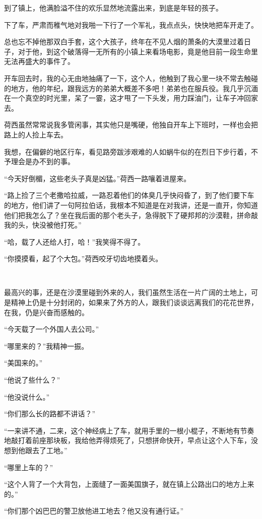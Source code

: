 \par 到了镇上，他满脸溢不住的欢乐显然地流露出来，到底是年轻的孩子。
\par 下了车，严肃而稚气地对我啪一下行了一个军礼，我点点头，快快地把车开走了。
\par 总也忘不掉他那双白手套，这个大孩子，终年在不见人烟的萧条的大漠里过着日子，对于他，到这个破落得一无所有的小镇上来看场电影，竟是他目前一段生命里无法再盛大的事件了。
\par 开车回去时，我的心无由地抽痛了一下，这个人，他触到了我心里一块不常去触碰的地方，他的年纪，跟我远方的弟弟大概差不多吧！弟弟也在服兵役。我几乎沉湎在一个真空的时光里，呆了一霎，这才甩了一下头发，用力踩油门，让车子冲回家去。
\par 荷西虽然常常说我多管闲事，其实他只是嘴硬，他独自开车上下班时，一样也会把路上的人捡上车去。
\par 我想，在偏僻的地区行车，看见路旁跋涉艰难的人如蜗牛似的在烈日下步行着，不予理会是办不到的事。
\par “今天好倒楣，这些老头子真是凶猛。”荷西一路嚷着进屋来。
\par “路上捡了三个老撒哈拉威，一路忍着他们的体臭几乎快闷昏了，到了他们要下车的地方，他们讲了一句阿拉伯话，我根本不知道是在对我讲，还是一直开，你知道他们把我怎么了？坐在我后面的那个老头子，急得脱下了硬邦邦的沙漠鞋，拼命敲我的头，快没被他打死。”
\par “哈，载了人还给人打，哈！”我笑得不得了。
\par “你摸摸看，起了个大包。”荷西咬牙切齿地摸着头。
\par  
\par 最高兴的事，还是在沙漠里碰到外来的人，我们虽然生活在一片广阔的土地上，可是精神上仍是十分封闭的，如果来了外方的人，跟我们谈谈远离我们的花花世界，在我，仍是兴奋而感触的。
\par “今天载了一个外国人去公司。”
\par “哪里来的？”我精神一振。
\par “美国来的。”
\par “他说了些什么？”
\par “他没说什么。”
\par “你们那么长的路都不讲话？”
\par “一来讲不通，二来，这个神经病上了车，就用手里的一根小棍子，不断地有节奏地敲打着前座那块板，我给他弄得烦死了，只想拼命快开，早点让这个人下车，没想到他跟去了工地。”
\par “哪里上车的？”
\par “这个人背了一个大背包，上面缝了一面美国旗子，就在镇上公路出口的地方上来的。”
\par “你们那个凶巴巴的警卫放他进工地去？他又没有通行证。”
